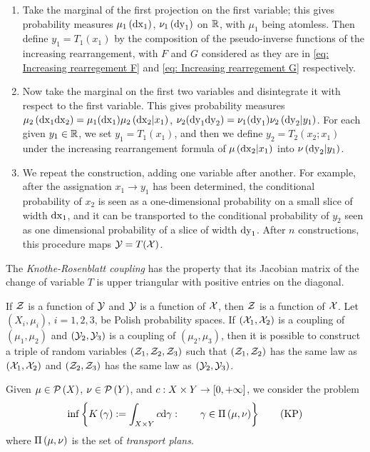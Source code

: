 \begin{enumerate}
	\item Take the marginal of the first projection on the first variable; this gives probability measures $\mu_1\left( \mathrm{dx}_1 \right)$, $\nu_1\left( \mathrm{dy}_1 \right)$ on $\mathbb{R}$, with $\mu_1$ being atomless. Then define $y_1=T_1(x_1)$ by the composition of the pseudo-inverse functions of the increasing rearrangement, with $F$ and $G$ considered as they are in \eqref{eq: Increasing rearregement F} and \eqref{eq: Increasing rearregement G} respectively.
	
	\item Now take the marginal on the first two variables and disintegrate it with respect to the first variable. This gives probability measures $\mu_2\left( \mathrm{dx}_1\mathrm{dx}_2 \right)=\mu_1(\mathrm{dx}_1)\mu_2\left( \mathrm{dx}_2 |x_1 \right)$, $\nu_2 (\mathrm{dy}_1\mathrm{dy}_2)=\nu_1(\mathrm{dy}_1)\nu_2\left( \mathrm{dy}_2|y_1 \right)$. For each given $y_1\in \mathbb{R}$, we set $y_1=T_1(x_1)$, and then we define $y_2=T_2(x_2; x_1)$ under the increasing rearrangement formula of $\mu\left( \mathrm{dx}_2| x_1 \right)$ into $\nu\left( \mathrm{dy}_2| y_1 \right)$.
	
	\item We repeat the construction, adding one variable after another. For example, after the assignation $x_1\rightarrow y_1$ has been determined, the conditional probability of $x_2$ is seen as a one-dimensional probability on a small slice of width $\mathrm{dx}_1$, and it can be transported to the conditional probability of $y_2$ seen as one dimensional probability of a slice of width $\mathrm{dy}_1$. After $n$ constructions, this procedure maps $\mathcal{Y}=T(\mathcal{X})$.
\end{enumerate} 

The \textit{Knothe-Rosenblatt coupling} has the property that its Jacobian matrix of the change of variable $T$ is upper triangular with positive entries on the diagonal. 	


\begin{lemma} If $\mathcal{Z}$ is a function of $\mathcal{Y}$ and $\mathcal{Y}$ is a function of $\mathcal{X}$, then $\mathcal{Z}$ is a function of $\mathcal{X}$. Let $(X_i , \mu_i)$, $i = 1, 2, 3$,  be Polish probability spaces. If $(\mathcal{X}_1 , \mathcal{X}_2)$ is a coupling of $(\mu_1, \mu_2 )$ and $(\mathcal{Y}_2 , \mathcal{Y}_3)$ is a coupling of $(\mu_2, \mu_3)$, then it is possible to construct a triple of random variables $(\mathcal{Z}_1 , \mathcal{Z}_2, \mathcal{Z}_3)$ such that $(\mathcal{Z}_1, \mathcal{Z}_2)$ has the same law as $(\mathcal{X}_1 ,\mathcal{X}_2)$ and $(\mathcal{Z}_2, \mathcal{Z}_3)$ has the same law as $(\mathcal{Y}_2, \mathcal{Y}_3)$.
\end{lemma}


\begin{problem}Given $\mu \in \mathcal{P}\left( X \right)$, $\nu \in \mathcal{P}\left( Y \right)$, and $c: X\times Y \rightarrow \left[ 0, +\infty \right]$, we consider the problem
	\begin{equation}
		\inf\left\lbrace K\left(\gamma\right) := \int_{X\times Y} c \mathrm{d}\gamma : \qquad \gamma \in \Pi\left(\mu, \nu\right) \right\rbrace\label{eq: Kantorovich's Problem.}\tag{KP}
	\end{equation}
where $\Pi\left(\mu, \nu\right)$ is the set of \textit{transport plans}.
\end{problem}

